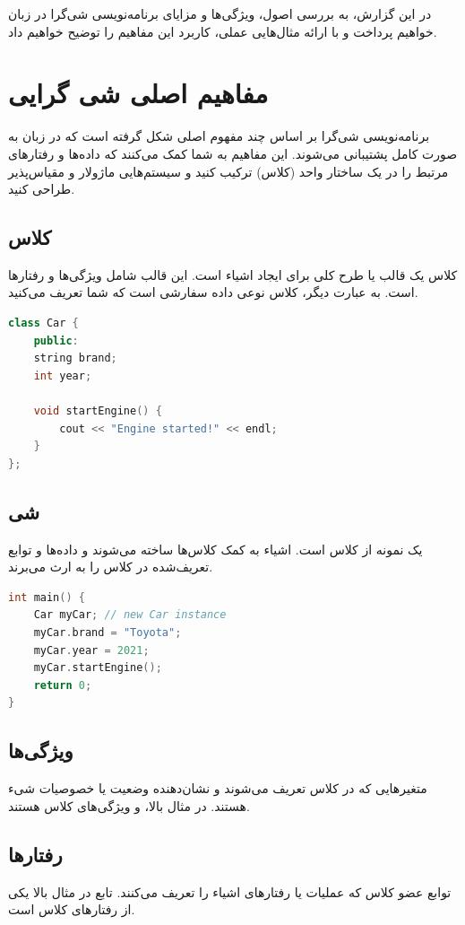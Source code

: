 \documentclass[12pt, a4paper]{report}
\begin{document}
در این گزارش، به بررسی اصول، ویژگی‌ها و مزایای برنامه‌نویسی شی‌گرا در زبان  خواهیم پرداخت و با ارائه مثال‌هایی عملی، کاربرد این مفاهیم را توضیح خواهیم داد.
\section{مفاهیم اصلی شی گرایی}
برنامه‌نویسی شی‌گرا بر اساس چند مفهوم اصلی شکل گرفته است که در زبان  به صورت کامل پشتیبانی می‌شوند. این مفاهیم به شما کمک می‌کنند که داده‌ها و رفتارهای مرتبط را در یک ساختار واحد (کلاس) ترکیب کنید و سیستم‌هایی ماژولار و مقیاس‌پذیر طراحی کنید.
\subsection{کلاس}
کلاس یک قالب یا طرح کلی برای ایجاد اشیاء است. این قالب شامل ویژگی‌ها و رفتارها است. به عبارت دیگر، کلاس نوعی داده سفارشی است که شما تعریف می‌کنید.
\LTR
\begin{lstlisting}[language=C++, breaklines=true]
class Car {
	public:
	string brand;
	int year;
	
	void startEngine() {
		cout << "Engine started!" << endl;
	}
};

\end{lstlisting}
\RTL
\subsection{شی}
یک نمونه از کلاس است. اشیاء به کمک کلاس‌ها ساخته می‌شوند و داده‌ها و توابع تعریف‌شده در کلاس را به ارث می‌برند.
\LTR
\begin{lstlisting}[language=C++, breaklines=true]
int main() {
	Car myCar; // new Car instance
	myCar.brand = "Toyota";
	myCar.year = 2021;
	myCar.startEngine();
	return 0;
}

\end{lstlisting}
\RTL
\subsection{ویژگی‌ها}
متغیرهایی که در کلاس تعریف می‌شوند و نشان‌دهنده وضعیت یا خصوصیات شیء هستند. در مثال بالا،  و  ویژگی‌های  کلاس  هستند.
\subsection{رفتار‌ها}
توابع عضو کلاس که عملیات یا رفتارهای اشیاء را تعریف می‌کنند. تابع  در مثال بالا یکی از رفتارهای کلاس  است.
\end{document}
